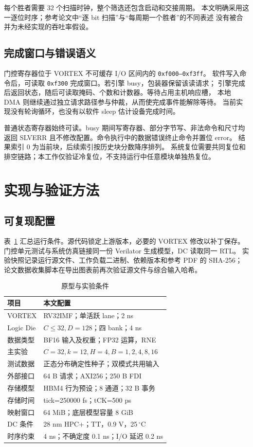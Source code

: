 \documentclass[conference,a4paper]{IEEEtran}
\begin{document}
每个胜者需要 32 个扫描时钟，整个筛选还包含启动和交接周期。
本文明确采用这一逐位时序；参考论文中“逐 bit 扫描”与“每周期一个胜者”的不同表述
没有被合并为未经实现的吞吐率假设。

\subsection{完成窗口与错误语义}
门控寄存器位于 VORTEX 不可缓存 I/O 区间内的 \texttt{0xf000--0xf3ff}。
软件写入命令后，可读取 \texttt{0xf300} 完成窗口。若引擎 busy，包装器保留该读请求；
引擎完成后返回状态，随后可读取掩码、个数和计数器。等待占用主机响应槽，
本地 DMA 则继续通过独立请求路径参与仲裁，从而使完成事件能解除等待。
当前实现没有轮询循环，也没有以软件 sleep 估计设备完成时间。

普通状态寄存器始终可读。busy 期间写寄存器、部分字节写、非法命令和尺寸均返回
SLVERR 且不修改配置。命令执行中的数据错误终止命令并置位 error。
结果索引 0 为当前块，后续索引按历史块分数降序排列。
系统复位需要共同复位和排空链路；本工作仅验证冷复位，不支持运行中任意模块单独热复位。

\section{实现与验证方法}
\subsection{可复现配置}
表~\ref{tab:config} 汇总运行条件。源代码锁定上游版本，必要的 VORTEX 修改以补丁保存。
门控单元测试与系统仿真链接同一份 Verilator 生成模型，DC 读取同一 RTL。
实验快照记录运行源文件、工作负载二进制、依赖版本和参考 PDF 的 SHA-256；
论文数据收集脚本在导出图表前再次验证源文件与综合输入哈希。

\begin{table}[t]
\caption{原型与实验条件}
\label{tab:config}\centering\small
\begin{tabular}{@{}ll@{}}
\toprule
项目 & 本文配置\\\midrule
VORTEX & RV32IMF；单活跃 lane；2 ns\\
Logic Die & $C\le32,D=128$；四 bank；4 ns\\
数据类型 & BF16 输入及权重；FP32 运算，RNE\\
主实验 & $C=32,k=12,H=4,B=1,2,4,8,16$\\
测试数据 & 正态分布确定性种子；双模式共用输入\\
外部接口 & 64 B 请求；AXI256；250 B FDI\\
存储模型 & HBM4 行为预设；8 通道；32 B 事务\\
存储时间 & tick=250000 fs；tCK=500 ps\\
映射窗口 & 64 MiB；底层模型容量 8 GiB\\
DC 条件 & 28 nm HPC+；TT，0.9 V，25\,$^\circ$C\\
时序约束 & 4 ns；不确定度 0.1 ns；I/O 延迟 0.2 ns\\
\bottomrule
\end{tabular}
\end{table}
\end{document}
